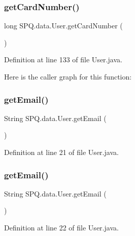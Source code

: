 \subsubsection{\texorpdfstring{get\+Card\+Number()}{getCardNumber()}}
{\footnotesize\ttfamily long S\+P\+Q.\+data.\+User.\+get\+Card\+Number (\begin{DoxyParamCaption}{ }\end{DoxyParamCaption})}



Definition at line 133 of file User.\+java.

Here is the caller graph for this function\+:
\mbox{\label{class_s_p_q_1_1data_1_1_user_a4f3ae0062ee7529314a5b791707ff4b4}} 
\subsubsection{\texorpdfstring{get\+Email()}{getEmail()}\hspace{0.1cm}{\footnotesize\ttfamily [1/4]}}
{\footnotesize\ttfamily String S\+P\+Q.\+data.\+User.\+get\+Email (\begin{DoxyParamCaption}{ }\end{DoxyParamCaption})}



Definition at line 21 of file User.\+java.

\mbox{\label{class_s_p_q_1_1data_1_1_user_a4f3ae0062ee7529314a5b791707ff4b4}} 
\subsubsection{\texorpdfstring{get\+Email()}{getEmail()}\hspace{0.1cm}{\footnotesize\ttfamily [2/4]}}
{\footnotesize\ttfamily String S\+P\+Q.\+data.\+User.\+get\+Email (\begin{DoxyParamCaption}{ }\end{DoxyParamCaption})}



Definition at line 22 of file User.\+java.

